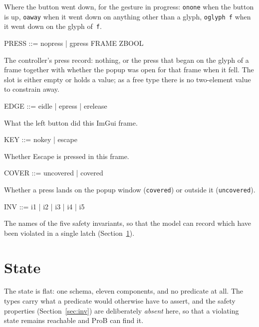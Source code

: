 \documentclass[a4paper,10pt,fleqn]{article}
\begin{document}
Where the button went down, for the gesture in progress: \texttt{onone} when
the button is up, \texttt{oaway} when it went down on anything other than a
glyph, \texttt{oglyph~f} when it went down on the glyph of~\texttt{f}.

\begin{zed}
  PRESS ::= nopress | gpress \ldata FRAME \cross ZBOOL \rdata
\end{zed}

The controller's press record: nothing, or the press that began on the glyph
of a frame together with whether the popup was open for that frame when it
fell.  The slot is either empty or holds a value; as a free type there is no
two-element value to constrain away.

\begin{zed}
  EDGE ::= eidle | epress | erelease
\end{zed}

What the left button did this ImGui frame.

\begin{zed}
  KEY ::= nokey | escape
\end{zed}

Whether Escape is pressed in this frame.

\begin{zed}
  COVER ::= uncovered | covered
\end{zed}

Whether a press lands on the popup window (\texttt{covered}) or outside it
(\texttt{uncovered}).

\begin{zed}
  INV ::= i1 | i2 | i3 | i4 | i5
\end{zed}

The names of the five safety invariants, so that the model can record which have
been violated in a single latch (Section~\ref{sec:state}).

\section{State}
\label{sec:state}

The state is flat: one schema, eleven components, and no predicate at all.  The
types carry what a predicate would otherwise have to assert, and the safety
properties (Section~\ref{sec:inv}) are deliberately \emph{absent} here, so that
a violating state remains reachable and ProB can find it.
\end{document}
